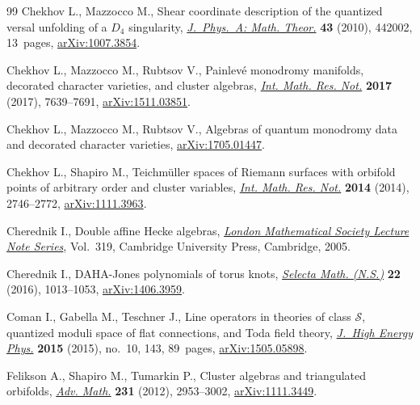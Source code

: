 \begin{thebibliography}{99}
Chekhov L., Mazzocco M., Shear coordinate description of the quantized versal
 unfolding of a {$D_4$} singularity, \href{https://doi.org/10.1088/1751-8113/43/44/442002}{\textit{J.~Phys.~A: Math. Theor.}}
 \textbf{43} (2010), 442002, 13~pages, \href{https://arxiv.org/abs/1007.3854}{arXiv:1007.3854}.

Chekhov L., Mazzocco M., Rubtsov V., Painlev\'{e} monodromy manifolds,
 decorated character varieties, and cluster algebras, \href{https://doi.org/10.1093/imrn/rnw219}{\textit{Int. Math. Res.
 Not.}} \textbf{2017} (2017), 7639--7691, \href{https://arxiv.org/abs/1511.03851}{arXiv:1511.03851}.

Chekhov L., Mazzocco M., Rubtsov V., Algebras of quantum monodromy data and
 decorated character varieties, \href{https://arxiv.org/abs/1705.01447}{arXiv:1705.01447}.

Chekhov L., Shapiro M., Teichm\"{u}ller spaces of {R}iemann surfaces with
 orbifold points of arbitrary order and cluster variables, \href{https://doi.org/10.1093/imrn/rnt016}{\textit{Int. Math.
 Res. Not.}} \textbf{2014} (2014), 2746--2772, \href{https://arxiv.org/abs/1111.3963}{arXiv:1111.3963}.

Cherednik I., Double affine {H}ecke algebras, \href{https://doi.org/10.1017/CBO9780511546501}{\textit{London Mathematical
 Society Lecture Note Series}}, Vol.~319, Cambridge University Press,
 Cambridge, 2005.

Cherednik I., D{AHA}-{J}ones polynomials of torus knots, \href{https://doi.org/10.1007/s00029-015-0210-1}{\textit{Selecta Math.
 (N.S.)}} \textbf{22} (2016), 1013--1053, \href{https://arxiv.org/abs/1406.3959}{arXiv:1406.3959}.

Coman I., Gabella M., Teschner J., Line operators in theories of class
 {$\mathcal S$}, quantized moduli space of flat connections, and {T}oda field
 theory, \href{https://doi.org/10.1007/JHEP10(2015)143}{\textit{J.~High Energy Phys.}} \textbf{2015} (2015), no.~10, 143,
 89~pages, \href{https://arxiv.org/abs/1505.05898}{arXiv:1505.05898}.

Felikson A., Shapiro M., Tumarkin P., Cluster algebras and triangulated
 orbifolds, \href{https://doi.org/10.1016/j.aim.2012.07.032}{\textit{Adv. Math.}} \textbf{231} (2012), 2953--3002,
 \href{https://arxiv.org/abs/1111.3449}{arXiv:1111.3449}.


\end{thebibliography}
